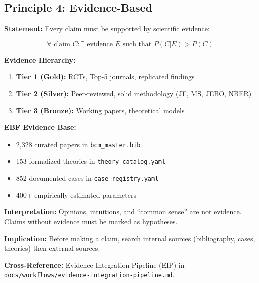 \subsection{Principle 4: Evidence-Based}

\begin{tcolorbox}[colback=gray!5!white, colframe=gray!75!black,
    title=Axiom PR-4: Evidence Primacy]

\textbf{Statement:} Every claim must be supported by scientific evidence:

\begin{equation}
\forall \text{ claim } C: \exists \text{ evidence } E \text{ such that } P(C | E) > P(C)
\end{equation}

\textbf{Evidence Hierarchy:}
\begin{enumerate}
    \item \textbf{Tier 1 (Gold):} RCTs, Top-5 journals, replicated findings
    \item \textbf{Tier 2 (Silver):} Peer-reviewed, solid methodology (JF, MS, JEBO, NBER)
    \item \textbf{Tier 3 (Bronze):} Working papers, theoretical models
\end{enumerate}

\textbf{EBF Evidence Base:}
\begin{itemize}[nosep]
    \item 2,328 curated papers in \texttt{bcm\_master.bib}
    \item 153 formalized theories in \texttt{theory-catalog.yaml}
    \item 852 documented cases in \texttt{case-registry.yaml}
    \item 400+ empirically estimated parameters
\end{itemize}

\textbf{Interpretation:} Opinions, intuitions, and ``common sense'' are not evidence. Claims without evidence must be marked as hypotheses.

\textbf{Implication:} Before making a claim, search internal sources (bibliography, cases, theories) then external sources.

\textbf{Cross-Reference:} Evidence Integration Pipeline (EIP) in \texttt{docs/workflows/evidence-integration-pipeline.md}.

\end{tcolorbox}


